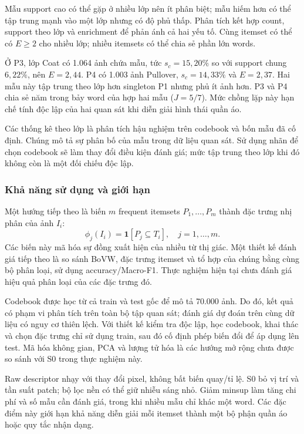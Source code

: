 Mẫu support cao có thể gặp ở nhiều lớp nên ít phân biệt; mẫu hiếm hơn
có thể tập trung mạnh vào một lớp nhưng có độ phủ thấp. Phân tích kết hợp count,
support theo lớp và enrichment để phản ánh cả hai yếu tố. Cùng itemset có thể có
$E\geq2$ cho nhiều lớp; nhiều itemsets có thể chia sẻ phần lớn words.

Ở P3, lớp Coat có 1.064 ảnh chứa mẫu, tức $s_c=15{,}20\%$ so với
support chung $6{,}22\%$, nên $E=2{,}44$. P4 có 1.003 ảnh Pullover,
$s_c=14{,}33\%$ và $E=2{,}37$. Hai mẫu này tập trung theo lớp hơn
singleton P1 nhưng phủ ít ảnh hơn. P3 và P4 chia sẻ năm trong bảy word
của hợp hai mẫu ($J=5/7$). Mức chồng lặp này hạn chế tính độc lập của
hai quan sát khi diễn giải hình thái quần áo.

Các thống kê theo lớp là phân tích hậu nghiệm trên codebook và bốn mẫu
đã cố định. Chúng mô tả sự phân bố của mẫu trong dữ liệu quan sát.
Sử dụng nhãn để chọn codebook sẽ làm thay đổi điều kiện đánh giá; mức
tập trung theo lớp khi đó không còn là một đối chiếu độc lập.

\subsubsection{Khả năng sử dụng và giới hạn}
Một hướng tiếp theo là biến $m$ frequent itemsets $P_1,\ldots,P_m$ thành
đặc trưng nhị phân của ảnh $I_i$:
\begin{equation}
\phi_j(I_i)=\mathbf{1}[P_j\subseteq T_i],\quad j=1,\ldots,m.
\end{equation}
Các biến này mã hóa sự đồng xuất hiện của nhiều từ thị giác. Một thiết
kế đánh giá tiếp theo là so sánh BoVW, đặc trưng itemset và tổ hợp của
chúng bằng cùng bộ phân loại, sử dụng accuracy/Macro-F1. Thực nghiệm
hiện tại chưa đánh giá hiệu quả phân loại của các đặc trưng đó.

Codebook được học từ cả train và test gốc để mô tả 70.000 ảnh. Do đó,
kết quả có phạm vi phân tích trên toàn bộ tập quan sát; đánh giá dự
đoán trên cùng dữ liệu có nguy cơ thiên lệch. Với thiết kế kiểm tra
độc lập, học codebook, khai thác và chọn đặc trưng chỉ sử dụng train,
sau đó cố định phép biến đổi để áp dụng lên test. Mã hóa không gian,
PCA và lượng tử hóa là các hướng mở rộng chưa được so sánh với S0
trong thực nghiệm này.

Raw descriptor nhạy với thay đổi pixel, không bất biến quay/tỉ lệ.
S0 bỏ vị trí và tần suất patch; bộ lọc nền có thể giữ nhiễu sáng nhỏ.
Giảm minsup làm tăng chi phí và số mẫu cần đánh giá, trong khi nhiều
mẫu chỉ khác một word. Các đặc điểm này giới hạn khả năng diễn giải
mỗi itemset thành một bộ phận quần áo hoặc quy tắc nhận dạng.
